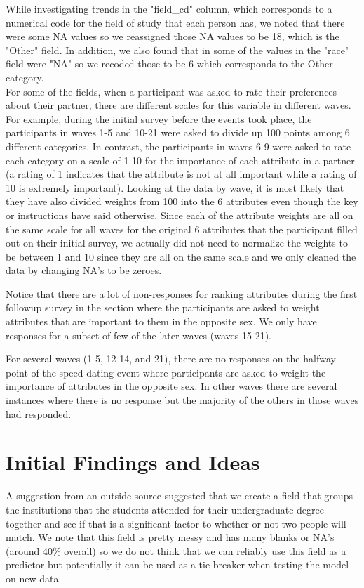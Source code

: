 \documentclass{article}
\begin{document}
While investigating trends in the "field\_cd" column, which corresponds to a numerical code for the field of study that each person has, we noted that there were some NA values  so we reassigned those NA values to be 18, which is the "Other" field.  In addition, we also found that in some of the values in the "race" field were "NA" so we recoded those to be 6 which corresponds to the Other category.\\

For some of the fields, when a participant was asked to rate their preferences about their partner, there are different scales for this variable in different waves.  For example, during the initial survey before the events took place, the participants in waves 1-5 and 10-21 were asked to divide up 100 points among 6 different categories.  In contrast, the participants in waves 6-9 were asked to rate each category on a scale of 1-10 for the importance of each attribute in a partner (a rating of 1 indicates that the attribute is not at all important while a rating of 10 is extremely important).  Looking at the data by wave, it is most likely that they have also divided weights from 100 into the 6 attributes even though the key or instructions have said otherwise. Since each of the attribute weights are all on the same scale for all waves for the original 6 attributes that the participant filled out on their initial survey, we actually did not need to normalize the weights to be between 1 and 10 since they are all on the same scale and we only cleaned the data by changing NA's to be zeroes.

Notice that there are a lot of non-responses for ranking attributes during the first followup survey in the section where the participants are asked to weight attributes that are important to them in the opposite sex.  We only have responses for a subset of few of the later waves (waves 15-21).

For several waves (1-5, 12-14, and 21), there are no responses on the halfway point of the speed dating event where participants are asked to weight the importance of attributes in the opposite sex. In other waves there are several instances where there is no response but the majority of the others in those waves had responded.

\section{Initial Findings and Ideas}
A suggestion from an outside source suggested that we create a field that groups the institutions that the students attended for their undergraduate degree together and see if that is a significant factor to whether or not two people will match.  We note that this field is pretty messy and has many blanks or NA's (around 40\% overall) so we do not think that we can reliably use this field as a predictor but potentially it can be used as a tie breaker when testing the model on new data.\\
\end{document}
